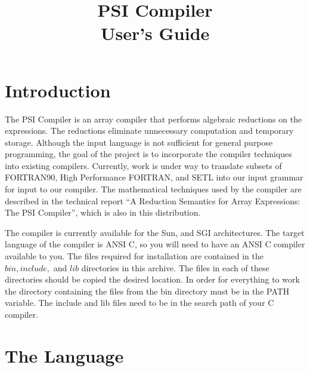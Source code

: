 
\addtolength{\topmargin}{-.75in}
\addtolength{\textwidth}{1.6in}
\setlength{\textheight}{8.75in}
\addtolength{\oddsidemargin}{-0.75in}
\addtolength{\evensidemargin}{-0.75in}
\setlength{\parskip}{.1in}

\title{PSI Compiler\\User's Guide}
\author{}


\maketitle

\section{Introduction}
The PSI Compiler is an array compiler that performs algebraic reductions on
the expressions.  The reductions eliminate unnecessary computation and temporary
storage.  Although the input language is not sufficient for general purpose
programming, the goal of the project is to incorporate the compiler techniques
into existing compilers.  Currently, work is under way to translate subsets
of FORTRAN90, High Performance FORTRAN, and SETL into our input grammar for
input to our compiler.  The mathematical techniques used by the compiler are
described in the technical report ``A Reduction Semantics for Array 
Expressions: The PSI Compiler'', which is also in this distribution.

The compiler is currently available for the Sun, and SGI architectures.  The 
target language of the compiler is ANSI C, so you will need to have an ANSI
C compiler available to you.  The files required for installation are contained
in the $bin,include,$ and $lib$ directories in this archive.  The files
in each of these directories should be copied the desired location.  In
order for everything to work the directory containing the files from the
bin directory must be in the PATH variable.  The include and lib files need
to be in the search path of your C compiler.

\section{The Language}

